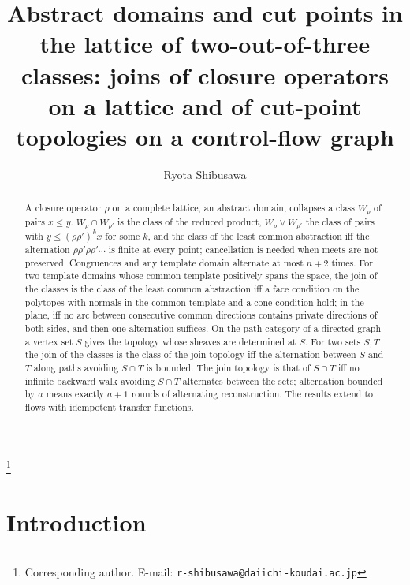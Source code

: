 \documentclass[11pt]{amsart}
\theoremstyle{definition}
\begin{document}
\title[Abstract domains and cut points in the sameness lattice]{Abstract domains and cut points in the lattice of two-out-of-three classes: joins of closure operators on a lattice and of cut-point topologies on a control-flow graph}
\author{Ryota Shibusawa}
\thanks{Corresponding author. E-mail: \texttt{r-shibusawa@daiichi-koudai.ac.jp}}
\address{Daiichi Institute of Technology}

\begin{abstract}
A closure operator $\rho$ on a complete lattice, an abstract domain,
collapses a class $W_\rho$ of pairs $x\le y$. $W_\rho\cap W_{\rho'}$ is
the class of the reduced product, $W_\rho\vee W_{\rho'}$ the class of
pairs with $y\le(\rho\rho')^kx$ for some $k$, and the class of the
least common abstraction iff the alternation $\rho\rho'\rho\rho'\cdots$
is finite at every point; cancellation is needed when meets are not
preserved. Congruences and any template domain alternate at most $n+2$
times. For two template domains whose common template positively spans
the space, the join of the classes is the class of the least common
abstraction iff a face condition on the polytopes with normals in the
common template and a cone condition hold; in the plane, iff no arc
between consecutive common directions contains private directions of
both sides, and then one alternation suffices. On the path category of a directed
graph a vertex set $S$ gives the topology whose sheaves are determined
at $S$. For two sets $S,T$ the join of the classes is the class of the
join topology iff the alternation between $S$ and $T$ along paths
avoiding $S\cap T$ is bounded.
The join topology is that of $S\cap T$ iff no infinite backward walk
avoiding $S\cap T$ alternates between the sets; alternation bounded by
$a$ means exactly $a+1$ rounds of alternating reconstruction. The
results extend to flows with idempotent transfer functions.
\end{abstract}

\maketitle

\section{Introduction}
\end{document}
